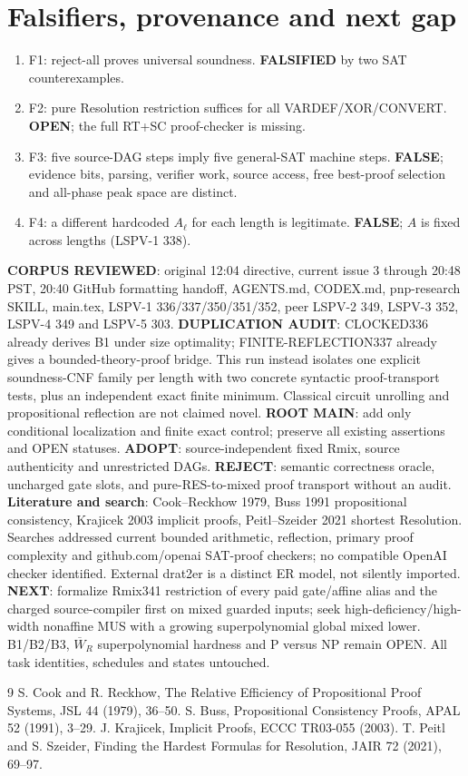 \documentclass[11pt]{article}
\begin{document}
\section*{Falsifiers, provenance and next gap}
\begin{enumerate}
\item[] F1: reject-all proves universal soundness. \textbf{FALSIFIED} by two SAT counterexamples.
\item[] F2: pure Resolution restriction suffices for all VARDEF/XOR/CONVERT. \textbf{OPEN}; the full RT+SC proof-checker is missing.
\item[] F3: five source-DAG steps imply five general-SAT machine steps. \textbf{FALSE}; evidence bits, parsing, verifier work, source access, free best-proof selection and all-phase peak space are distinct.
\item[] F4: a different hardcoded $A_\ell$ for each length is legitimate. \textbf{FALSE}; $A$ is fixed across lengths (LSPV-1 338).
\end{enumerate}
\noindent\textbf{CORPUS REVIEWED}: original 12:04 directive, current issue 3 through 20:48 PST, 20:40 GitHub formatting handoff, AGENTS.md, CODEX.md, pnp-research SKILL, main.tex, LSPV-1 336/337/350/351/352, peer LSPV-2 349, LSPV-3 352, LSPV-4 349 and LSPV-5 303. \textbf{DUPLICATION AUDIT}: CLOCKED336 already derives B1 under size optimality; FINITE-REFLECTION337 already gives a bounded-theory-proof bridge. This run instead isolates one explicit soundness-CNF family per length with two concrete syntactic proof-transport tests, plus an independent exact finite minimum. Classical circuit unrolling and propositional reflection are not claimed novel. \textbf{ROOT MAIN}: add only conditional localization and finite exact control; preserve all existing assertions and OPEN statuses. \textbf{ADOPT}: source-independent fixed Rmix, source authenticity and unrestricted DAGs. \textbf{REJECT}: semantic correctness oracle, uncharged gate slots, and pure-RES-to-mixed proof transport without an audit.
\noindent\textbf{Literature and search}: Cook--Reckhow 1979, Buss 1991 propositional consistency, Krajicek 2003 implicit proofs, Peitl--Szeider 2021 shortest Resolution. Searches addressed current bounded arithmetic, reflection, primary proof complexity and github.com/openai SAT-proof checkers; no compatible OpenAI checker identified. External drat2er is a distinct ER model, not silently imported.
\noindent\textbf{NEXT}: formalize Rmix341 restriction of every paid gate/affine alias and the charged source-compiler first on mixed guarded inputs; seek high-deficiency/high-width nonaffine MUS with a growing superpolynomial global mixed lower. B1/B2/B3, $\overline W_R$ superpolynomial hardness and P versus NP remain OPEN. All task identities, schedules and states untouched.
\begin{thebibliography}{9}
 S. Cook and R. Reckhow, The Relative Efficiency of Propositional Proof Systems, JSL 44 (1979), 36--50.
 S. Buss, Propositional Consistency Proofs, APAL 52 (1991), 3--29.
 J. Krajicek, Implicit Proofs, ECCC TR03-055 (2003).
 T. Peitl and S. Szeider, Finding the Hardest Formulas for Resolution, JAIR 72 (2021), 69--97.
\end{thebibliography}
\end{document}

